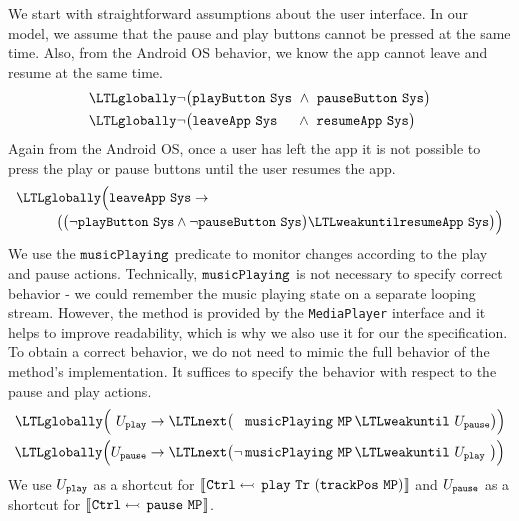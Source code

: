 We start with straightforward assumptions about the user interface.
In our model, we assume that the pause and play buttons cannot be pressed at the same time.
Also, from the Android OS behavior, we know the app cannot leave and resume at the same time.
%
\setcounter{equation}{0}
\renewcommand{\theequation}{A\arabic{equation}}
%
\begin{align}
  &\LTLglobally \neg \big( \name{playButton}~\name{Sys} \ \wedge \ \name{pauseButton}~\name{Sys}\big) \\
  &\LTLglobally \neg \big( \name{leaveApp}~\name{Sys} \phantom{\name{o}ri} \wedge \ \name{resumeApp}~\name{Sys}\big)
\end{align}
%
Again from the Android OS, once a user has left the app it is not possible to press the play or pause buttons until the user resumes the app.
%
\begin{equation}
  \begin{array}{l}\LTLglobally \Big( \name{leaveApp}~\name{Sys} \impl \\
    \quad \hspace{2em} \big(\big(\neg \name{playButton}~\name{Sys} \wedge \neg \name{pauseButton}~\name{Sys} \big) \LTLweakuntil \name{resumeApp}~\name{Sys}\big) \Big) \end{array}
\end{equation}
%
We use the $ {\text{\texttt{musicPlaying}}} $ predicate to monitor changes according to the play and pause actions.
Technically, $ {\text{\texttt{musicPlaying}}} $ is not necessary to specify correct behavior - we could remember the music playing state on a separate looping stream.
However, the method is provided by the \texttt{MediaPlayer} interface and it helps to improve readability, which is why we also use it for our the specification. To obtain a correct behavior, we do not need to mimic the full behavior of the method's implementation. It suffices to specify the behavior with respect to the pause and play actions.
%
\begin{align}
   \LTLglobally \Big(\hspace{3.4pt}U_{\name{play}} & \to \LTLnext \big(\phantom{\neg\,} \name{musicPlaying}~\name{MP}\, \LTLweakuntil \ U_{\name{pause}} \big) \Big) \\
  \LTLglobally \Big(U_{\name{pause}}                   & \to \LTLnext \big(\neg \, \name{musicPlaying}~\name{MP}\, \LTLweakuntil \ U_{\name{play}} \hspace{3.4pt}\big) \Big)
\end{align}
%
We use $ U_{{\text{\texttt{play}}}} $ as a shortcut for $ \llbracket \hspace{0.5pt} {\text{\texttt{Ctrl}}} \leftarrowtail \, {\text{\texttt{play}}}~{\text{\texttt{Tr}}}~({\text{\texttt{trackPos}}}~{\text{\texttt{MP}}}) \hspace{0.5pt} \rrbracket $ and $ U_{{\text{\texttt{pause}}}} $ as a shortcut for $ \llbracket \hspace{0.5pt} {\text{\texttt{Ctrl}}} \leftarrowtail \, {\text{\texttt{pause}}}~{\text{\texttt{MP}}} \hspace{0.5pt} \rrbracket $.


